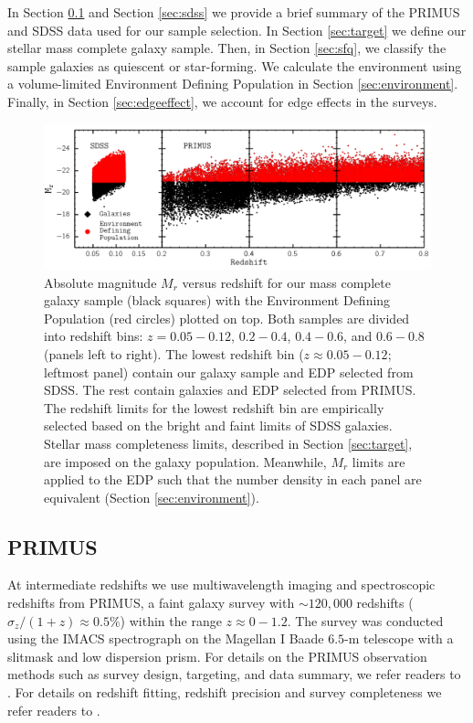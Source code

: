 In Section \ref{sec:primus} and Section \ref{sec:sdss} we provide a
brief summary of the PRIMUS and SDSS data used for our sample
selection. In Section \ref{sec:target} we define our stellar mass complete galaxy sample.  
Then, in Section \ref{sec:sfq}, we classify the sample galaxies as quiescent or star-forming. 
We calculate the environment
using a volume-limited Environment Defining Population in Section
\ref{sec:environment}.  Finally, in Section \ref{sec:edgeeffect}, we
account for edge effects in the surveys.

\begin{figure}
\begin{center}
\includegraphics[width=\textwidth]{figs/qfenv/fig1.pdf}
\caption{Absolute magnitude $M_{r}$ versus redshift for our mass complete galaxy sample (black squares) with the Environment Defining Population (red circles) plotted on top. Both samples are divided into redshift bins: $z = 0.05-0.12$, $0.2-0.4$, $0.4-0.6$, and $0.6-0.8$ (panels left to right). The lowest redshift bin ($z \approx 0.05-0.12$; leftmost panel) contain our galaxy sample and EDP selected from SDSS. The rest contain galaxies and EDP selected from PRIMUS. The redshift limits for the lowest redshift bin are empirically selected based on the bright and faint limits of SDSS galaxies. Stellar mass completeness limits, described in Section \ref{sec:target}, are imposed on the galaxy population. Meanwhile, $M_{r}$ limits are applied to the EDP such that the number density in each panel are equivalent (Section \ref{sec:environment}).} \label{fig:targetEDP}
\end{center}
\end{figure}
\subsection{PRIMUS} \label{sec:primus}
At intermediate redshifts we use multiwavelength imaging and
spectroscopic redshifts from PRIMUS, a faint galaxy survey with $\sim
120,000$ redshifts ($\sigma_z/(1+z) \approx 0.5 \%$) within the range
$z \approx 0-1.2$. The survey was conducted using the IMACS
spectrograph on the Magellan I Baade $6.5$-m telescope with a slitmask and low dispersion prism. For details on the PRIMUS observation methods such as survey design, targeting, and data summary, we refer readers to \cite{Coil:2011aa}. For details on redshift fitting, redshift precision and survey completeness we refer readers to \cite{Cool:2013aa}.

